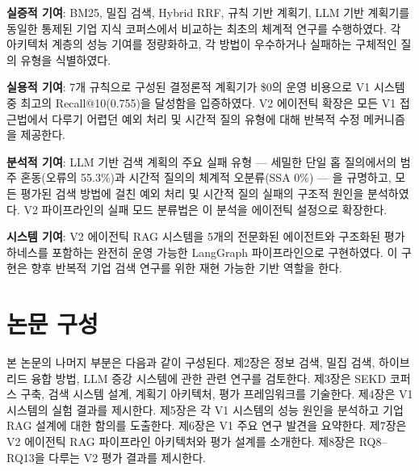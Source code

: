 \textbf{실증적 기여}: BM25, 밀집 검색, Hybrid RRF, 규칙 기반 계획기, LLM 기반 계획기를 동일한 통제된 기업 지식 코퍼스에서 비교하는 최초의 체계적 연구를 수행하였다. 각 아키텍처 계층의 성능 기여를 정량화하고, 각 방법이 우수하거나 실패하는 구체적인 질의 유형을 식별하였다.

\textbf{실용적 기여}: 7개 규칙으로 구성된 결정론적 계획기가 \$0의 운영 비용으로 V1 시스템 중 최고의 Recall@10(0.755)을 달성함을 입증하였다. V2 에이전틱 확장은 모든 V1 접근법에서 다루기 어렵던 예외 처리 및 시간적 질의 유형에 대해 반복적 수정 메커니즘을 제공한다.

\textbf{분석적 기여}: LLM 기반 검색 계획의 주요 실패 유형 — 세밀한 단일 홉 질의에서의 범주 혼동(오류의 55.3\%)과 시간적 질의의 체계적 오분류(SSA 0\%) — 을 규명하고, 모든 평가된 검색 방법에 걸친 예외 처리 및 시간적 질의 실패의 구조적 원인을 분석하였다. V2 파이프라인의 실패 모드 분류법은 이 분석을 에이전틱 설정으로 확장한다.

\textbf{시스템 기여}: V2 에이전틱 RAG 시스템을 5개의 전문화된 에이전트와 구조화된 평가 하네스를 포함하는 완전히 운영 가능한 LangGraph 파이프라인으로 구현하였다. 이 구현은 향후 반복적 기업 검색 연구를 위한 재현 가능한 기반 역할을 한다.

\section{논문 구성}
\label{sec:intro_structure_ko}

본 논문의 나머지 부분은 다음과 같이 구성된다. 제2장은 정보 검색, 밀집 검색, 하이브리드 융합 방법, LLM 증강 시스템에 관한 관련 연구를 검토한다. 제3장은 SEKD 코퍼스 구축, 검색 시스템 설계, 계획기 아키텍처, 평가 프레임워크를 기술한다. 제4장은 V1 시스템의 실험 결과를 제시한다. 제5장은 각 V1 시스템의 성능 원인을 분석하고 기업 RAG 설계에 대한 함의를 도출한다. 제6장은 V1 주요 연구 발견을 요약한다. 제7장은 V2 에이전틱 RAG 파이프라인 아키텍처와 평가 설계를 소개한다. 제8장은 RQ8--RQ13을 다루는 V2 평가 결과를 제시한다.
